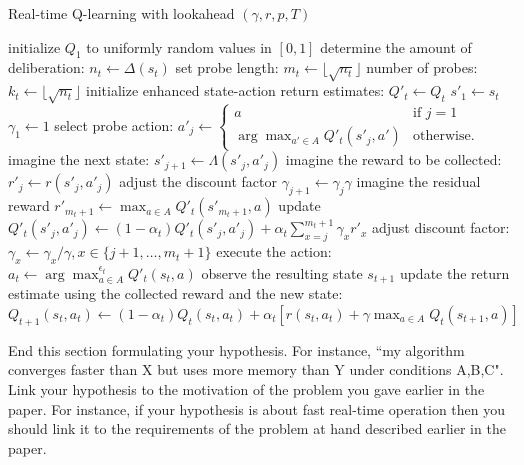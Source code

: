 \documentclass[letterpaper]{article}
\numberwithin{equation}{section}
\numberwithin{theorem}{section}
\numberwithin{lemma}{section}
\numberwithin{df}{section}
\begin{document}
\begin{algorithm*}[t]
\DontPrintSemicolon
\label{alg:fAlg}
\caption{Real-time Q-learning with lookahead $(\gamma, r, p, T)$}

initialize $Q_1$ to uniformly random values in $[0,1]$\;
{
determine the amount of deliberation: $n_t \leftarrow \Delta(s_t)$ \; \label{al:amountOfDeliberation} 
set probe length: $m_t \leftarrow \lfloor \sqrt{n_t} \rfloor$ \; \label{al:probeLength}
number of probes: $k_t \leftarrow \lfloor \sqrt{n_t} \rfloor$ \; \label{al:probeNumber}
%
initialize enhanced state-action return estimates: $Q'_t \leftarrow Q_t$ \;
%
{
%
{
$s'_1 \leftarrow s_t$ \;\label{al:firstState}
$\gamma_1 \leftarrow 1$ \;
%
{
select probe action: $a'_j \leftarrow \begin{cases}
a & \text{if $j=1$} \\ 
\arg \max_{a' \in A} Q'_t(s'_j,a') & \text{otherwise.} 
\end{cases}$ \; \label{al:selectProbeAction}
imagine the next state: $s'_{j+1} \leftarrow \Lambda(s'_j,a'_j)$ \;\label{al:applyProbeAction}
imagine the reward to be collected: $r'_j \leftarrow r(s'_j,a'_j)$ \;\label{al:collectProbeReward}
adjust the discount factor $\gamma_{j+1} \leftarrow \gamma_j \gamma$ \;
}
imagine the residual reward $r'_{m_t+1} \leftarrow \max_{a \in A} Q'_t(s'_{m_t+1},a)$ \;\label{al:residualReward}
%
{
update $Q'_t(s'_j,a'_j) \leftarrow (1-\alpha_t) Q'_t(s'_j,a'_j) + \alpha_t
\sum_{x = j}^{{m_t}+1} \gamma_x r'_x$ \;\label{al:learningProbe}
adjust discount factor: $\gamma_x \leftarrow \gamma_x / \gamma, x \in \{j+1,\dots,m_t+1\}$\;
}
}
}
execute the action: $a_t \leftarrow \arg \max^{\epsilon_t}_{a \in A} Q'_t(s_t,a)$ \;\label{al:actionSelect}\label{al:actionExecute}
observe the resulting state $s_{t+1}$ \;
%
update the return estimate using the collected reward and the new state: $Q_{t+1}(s_t,a_t) \leftarrow (1-\alpha_t) Q_t(s_t,a_t) + \alpha_t \left[ r(s_t,a_t) + \gamma \max_{a \in A} Q_t(s_{t+1},a) \right]$ \; \label{al:learningQ}
}
\end{algorithm*}

End this section formulating your hypothesis. For instance, ``my algorithm converges faster than X but uses more memory than Y under conditions A,B,C". Link your hypothesis to the motivation of the problem you gave earlier in the paper. For instance, if your hypothesis is about fast real-time operation then you should link it to the requirements of the problem at hand described earlier in the paper. 
\end{document}
